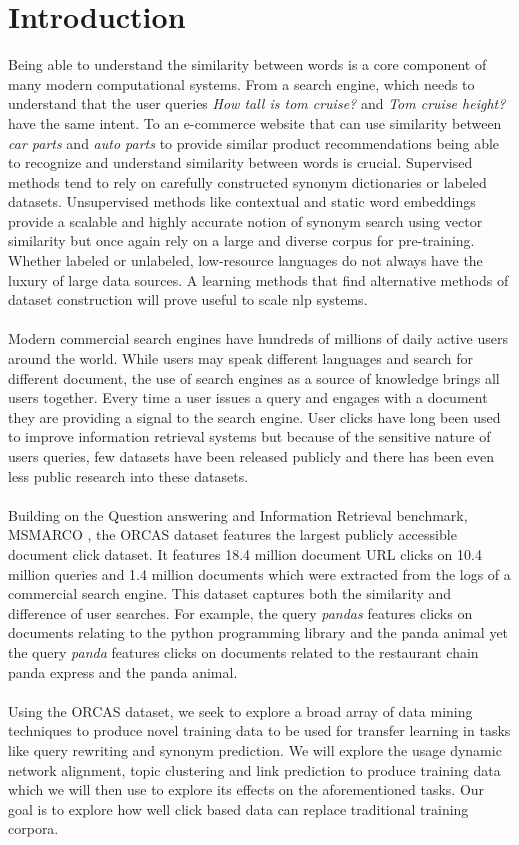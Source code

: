 \section{Introduction}
Being able to understand the similarity between words is a core component of many modern computational systems. From a search engine, which needs to understand that the user queries \textit{How tall is tom cruise?} and \textit{Tom cruise height?} have the same intent. To an e-commerce website that can use similarity between \textit{car parts} and \textit{auto parts} to provide similar product recommendations being able to recognize and understand similarity between words is crucial. Supervised methods tend to rely on carefully constructed synonym dictionaries or labeled datasets. Unsupervised methods like contextual \cite{Devlin2019BERTPO} and static word embeddings \cite{Mikolov2013DistributedRO}  provide a scalable and highly accurate notion of synonym search using vector similarity but once again rely on a large and diverse corpus for pre-training. Whether labeled or unlabeled, low-resource languages do not always have the luxury of large data sources. A learning methods that find alternative methods of dataset construction will prove useful to scale nlp systems. \\ \\
Modern commercial search engines have hundreds of millions of daily active users around the world. While users may speak different languages and search for different document, the use of search engines as a source of knowledge brings all users together. Every time a user issues a query and engages with a document they are providing a signal to the search engine. User clicks have long been used to improve information retrieval systems \cite{Chuklin2013ClickMI} but because of the sensitive nature of users queries, few datasets have been released publicly and there has been even less public research into these datasets. \\ \\
Building on the Question answering and Information Retrieval benchmark, MSMARCO \cite{Campos2016MSMA}, the ORCAS \cite{Craswell2020ORCAS2M} dataset features the largest publicly accessible document click dataset. It features 18.4 million document URL clicks on 10.4 million queries and 1.4 million documents which were extracted from the logs of a commercial search engine. This dataset captures both the similarity and difference of user searches. For example, the query \textit{pandas} features clicks on documents relating to the python programming library and the panda animal yet the query \textit{panda} features clicks on documents related to the restaurant chain panda express and the panda animal. \\ \\
Using the ORCAS dataset, we seek to explore a broad array of data mining techniques to produce novel training data to be used for transfer learning in tasks like query rewriting and synonym prediction. We will explore the usage dynamic network alignment, topic clustering and link prediction to produce training data which we will then use to explore its effects on the aforementioned tasks. Our goal is to explore how well click based data can replace traditional training corpora. \\